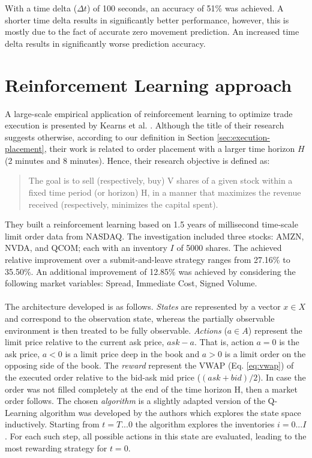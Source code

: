 With a time delta ($\Delta{t}$) of 100 seconds, an accuracy of 51\% was achieved.
A shorter time delta results in significantly better performance, however, this is mostly due to the fact of accurate zero movement prediction.
An increased time delta results in significantly worse prediction accuracy.

\section{Reinforcement Learning approach}

A large-scale empirical application of reinforcement learning to optimize trade execution is presented by Kearns et al. \cite{nevmyvaka2006reinforcement}.
Although the title of their research suggests otherwise, according to our definition in Section \ref{sec:execution-placement}, their work is related to order placement with a larger time horizon $H$ (2 minutes and 8 minutes).
Hence, their research objective is defined as:
\begin{quote}
    The goal is to sell (respectively, buy) V shares of a given stock within a fixed time period (or horizon) H, in a manner that maximizes the revenue received (respectively, minimizes the capital spent).
\end{quote}
They built a reinforcement learning based on 1.5 years of millisecond time-scale limit order data from NASDAQ.
The investigation included three stocks: AMZN, NVDA, and QCOM; each with an inventory $I$ of 5000 shares.
The achieved relative improvement over a submit-and-leave strategy ranges from 27.16\% to 35.50\%.
An additional improvement of 12.85\% was achieved by considering the following market variables: Spread, Immediate Cost, Signed Volume.
\\
\\
The architecture developed is as follows.
\textit{States} are represented by a vector $x \in X$ and correspond to the observation state, whereas the partially observable environment is then treated to be fully observable.
\textit{Actions} ($a \in A$) represent the limit price relative to the current ask price, $ask - a$. 
That is, action $a = 0$ is the ask price, $a < 0$ is a limit price deep in the book and $a > 0$ is a limit order on the opposing side of the book.
The \textit{reward} represent the VWAP (Eq. \ref{eq:vwap}) of the executed order relative to the bid-ask mid price ($(ask + bid) / 2$).
In case the order was not filled completely at the end of the time horizon H, then a market order follows.
The chosen \textit{algorithm} is a slightly adapted version of the Q-Learning algorithm was developed by the authors which explores the state space inductively.
Starting from $t=T...0$ the algorithm explores the inventories $i=0...I$.
For each such step, all possible actions in this state are evaluated, leading to the most rewarding strategy for $t=0$.